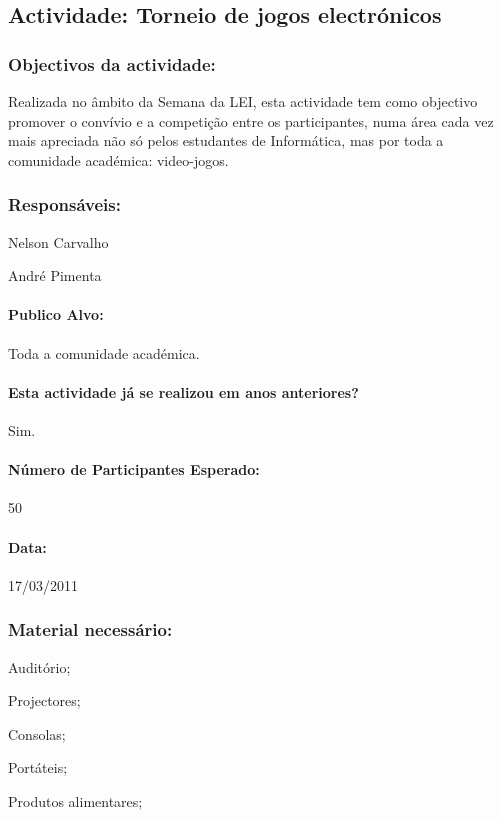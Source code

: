 \subsection{Actividade: Torneio de jogos electrónicos} 

\subsubsection*{Objectivos da actividade:}
Realizada no âmbito da Semana da LEI, esta actividade tem como objectivo promover o convívio e a competição entre os participantes, numa área cada vez mais apreciada não só pelos estudantes de Informática, mas por toda a comunidade académica: video-jogos.

\subsubsection*{Responsáveis:}
\begin{itemizedash}
	\item{Nelson Carvalho}
	\item{André Pimenta}
\end{itemizedash}

\paragraph{Publico Alvo: }
Toda a comunidade académica.

\paragraph{Esta actividade já se realizou em anos anteriores?}
Sim.

\paragraph{Número de Participantes Esperado:}
50

\paragraph{Data:} 17/03/2011

\subsubsection*{Material necessário:}
\begin{itemizedash}
	\item{Auditório;}
	\item{Projectores;}
	\item{Consolas;}
	\item{Portáteis;}
	\item{Produtos alimentares;}
\end{itemizedash}

